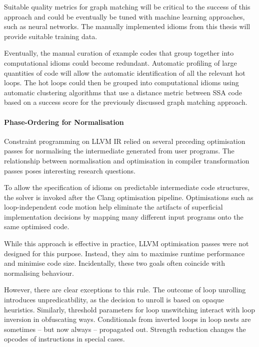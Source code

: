     Suitable quality metrics for graph matching will be critical to the success
    of this approach and could be eventually be tuned with machine learning
    approaches, such as neural networks.
    The manually implemented idioms from this thesis will provide suitable
    training data.

    Eventually, the manual curation of example codes that group together into
    computational idioms could become redundant.
    Automatic profiling of large quantities of code will allow the automatic
    identification of all the relevant hot loops.
    The hot loops could then be grouped into computational idioms using
    automatic clustering algorithms that use a distance metric between SSA code
    based on a success score for the previously discussed graph matching
    approach.

    \paragraph*{Phase-Ordering for Normalisation}
    Constraint programming on LLVM IR relied on several preceding optimisation
    passes for normalising the intermediate generated from user programs.
    The relationship between normalisation and optimisation in compiler
    transformation passes poses interesting research questions.

    To allow the specification of idioms on predictable intermediate code
    structures, the solver is invoked after the Clang optimisation pipeline.
    Optimisations such as loop-independent code motion help eliminate the
    artifacts of superficial implementation decisions by mapping many different
    input programs onto the same optimised code.

    While this approach is effective in practice, LLVM optimisation passes were
    not designed for this purpose.
    Instead, they aim to maximise runtime performance and minimise code size.
    Incidentally, these two goals often coincide with normalising behaviour.

    However, there are clear exceptions to this rule.
    The outcome of loop unrolling introduces unpredicatbility, as the decision
    to unroll is based on opaque heuristics.
    Similarly, threshold parameters for loop unswitching interact with loop
    inversion in obfuscating ways.
    Conditionals from inverted loops in loop nests are sometimes -- but
    now always -- propagated out.
    Strength reduction changes the opcodes of instructions in special cases.

